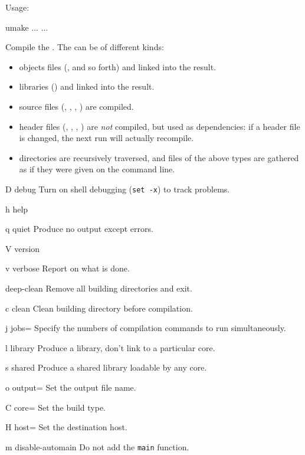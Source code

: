 Usage:
\begin{shell}
umake ... ...
\end{shell}

Compile the .  The  can be of different kinds:
\begin{itemize}
\item objects files (,  and so forth) and linked
  into the result.
\item libraries () and linked into the result.
\item source files (, , , )
  are compiled.
\item header files (, , ,
  ) are \emph{not} compiled, but used as dependencies: if
  a header file is changed, the next  run will actually
  recompile.
\item directories are recursively traversed, and files of the above
  types are gathered as if they were given on the command line.
\end{itemize}

\begin{options}
\item[D]{debug} Turn on shell debugging (\lstinline|set -x|) to
  track  problems.
\item[h]{help} \optionHelp
\item[q]{quiet} Produce no output except errors.
\item[V]{version} \optionVersion
\item[v]{verbose} Report on what is done.
\end{options}

\begin{options}
\item{deep-clean} Remove all building directories and exit.
\item[c]{clean} Clean building directory before compilation.
\item[j]{jobs=} Specify the numbers of compilation commands to run
  simultaneously.
\item[l]{library} Produce a library, don't link to a particular core.
\item[s]{shared} Produce a shared library loadable by any core.
\item[o]{output=} Set the output file name.
\item[C]{core=} Set the build type.
\item[H]{host=} Set the destination host.
\item[m]{disable-automain} Do not add the \lstinline|main| function.
\end{options}

